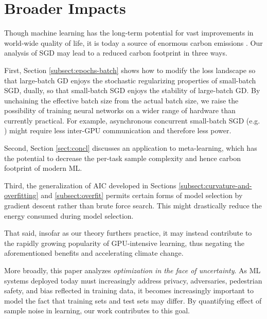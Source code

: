 \documentclass{article}
\theoremstyle{plain}
\theoremstyle{definition}
\begin{document}
\section*{Broader Impacts}

    Though machine learning has the long-term potential for vast improvements
    in world-wide quality of life, it is today a source of enormous carbon
    emissions \cite{st19}.  Our analysis of SGD may lead to a reduced carbon
    footprint in three ways. 
     
    First, Section \ref{subsect:epochs-batch} shows how to modify the loss
    landscape so that large-batch GD enjoys the stochastic regularizing
    properties of small-batch SGD, dually, so that small-batch SGD enjoys the
    stability of large-batch GD.  By unchaining the effective batch size from
    the actual batch size, we raise the possibility of training neural networks
    on a wider range of hardware than currently practical.  For example,
    asynchronous concurrent small-batch SGD (e.g. \citet{ni11}) might require
    less inter-GPU communication and therefore less power.
     
    Second, Section \ref{sect:concl} discusses an application to meta-learning,
    which has the potential to decrease the per-task sample complexity and
    hence carbon footprint of modern ML.
     
    Third, the generalization of AIC developed in  Sections
    \ref{subsect:curvature-and-overfitting} and \ref{subsect:overfit} permits
    certain forms of model selection by gradient descent rather than brute
    force search.  This might drastically reduce the energy consumed during
    model selection.

    That said, insofar as our theory furthers practice, it may instead
    contribute to the rapidly growing popularity of GPU-intensive learning,
    thus negating the aforementioned benefits and accelerating climate change.

    More broadly, this paper analyzes \emph{optimization in the face of
    uncertainty}.  As ML systems deployed today must increasingly address
    privacy, adversaries, pedestrian safety, and bias reflected in training
    data, it becomes increasingly important to model the fact that training
    sets and test sets may differ.  By quantifying effect of sample noise in
    learning, our work contributes to this goal. 

\end{document}
